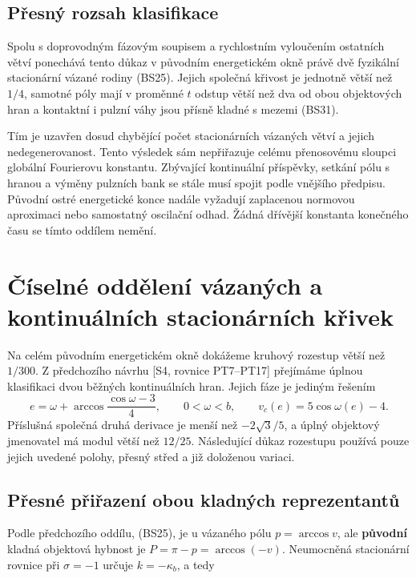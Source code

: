 \documentclass[11pt,a4paper]{article}
\theoremstyle{remark}\newtheorem{remark}[theorem]{Poznámka}
\numberwithin{equation}{section}
\begin{document}
\subsection{Přesný rozsah klasifikace}

Spolu s doprovodným fázovým soupisem a rychlostním vyloučením
ostatních větví ponechává tento důkaz v původním energetickém okně
právě dvě fyzikální stacionární vázané rodiny (BS25). Jejich
společná křivost je jednotně větší než \(1/4\), samotné póly mají
v proměnné \(t\) odstup větší než dva od obou objektových hran
a kontaktní i pulzní váhy jsou přísně kladné s mezemi (BS31).

Tím je uzavřen dosud chybějící počet stacionárních vázaných větví
a jejich nedegenerovanost. Tento výsledek sám nepřiřazuje celému
přenosovému sloupci globální Fourierovu konstantu. Zbývající
kontinuální příspěvky, setkání pólu s hranou a výměny pulzních
bank se stále musí spojit podle vnějšího předpisu. Původní ostré
energetické konce nadále vyžadují zaplacenou normovou aproximaci
nebo samostatný oscilační odhad. Žádná dřívější konstanta
konečného času se tímto oddílem nemění.

\section{Číselné oddělení vázaných a kontinuálních stacionárních křivek}
Na celém původním energetickém okně dokážeme kruhový rozestup
větší než \(1/300\). Z předchozího návrhu [S4, rovnice PT7--PT17]
přejímáme úplnou klasifikaci dvou běžných kontinuálních hran.
Jejich fáze je jediným řešením
\[
e=\omega+\arccos\frac{\cos\omega-3}{4},\qquad 0<\omega<b,\qquad v_c(e)=5\cos\omega(e)-4.
\]
Příslušná společná druhá derivace je menší než \(-2\sqrt3/5\),
a úplný objektový jmenovatel má modul větší než \(12/25\).
Následující důkaz rozestupu používá pouze jejich uvedené polohy,
přesný střed a již doloženou variaci.

\hypertarget{pux159esnuxe9-pux159iux159azenuxed-obou-kladnuxfdch-reprezentantux16f}{%
\subsection{Přesné přiřazení obou kladných
reprezentantů}\label{pux159esnuxe9-pux159iux159azenuxed-obou-kladnuxfdch-reprezentantux16f}}

Podle předchozího oddílu, (BS25), je u vázaného pólu \(p=\arccos v\),
ale \textbf{původní} kladná objektová hybnost je
\(P=\pi-p=\arccos(-v)\). Neumocněná stacionární rovnice při
\(\sigma=-1\) určuje \(k=-\kappa_b\), a tedy
\end{document}
